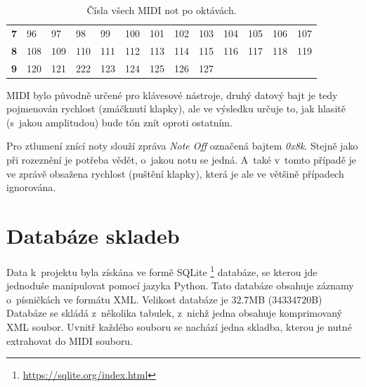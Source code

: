 \begin{table}[]
\begin{tabular}{l|llllllllllll}
        \textbf{7}                       & 96         & 97           & 98         & 99           & 100        & 101        & 102          & 103        & 104          & 105        & 106          & 107        \\
        \textbf{8}                       & 108        & 109          & 110        & 111          & 112        & 113        & 114          & 115        & 116          & 117        & 118          & 119        \\
        \textbf{9}                       & 120        & 121          & 222        & 123          & 124        & 125        & 126          & 127        & \multicolumn{4}{l}{}                                 
    \end{tabular}
    \caption{Čísla všech MIDI not po oktávách. \cite{Back_SMF_Specif}}
    \label{tableMIDINotes}
\end{table}

MIDI bylo původně určené pro klávesové nástroje, 
druhý datový bajt je tedy pojmenován rychlost (zmáčknutí klapky),
ale ve výsledku určuje to, jak hlasitě (s~jakou amplitudou) bude tón znít oproti ostatním.

Pro ztlumení znící noty slouží zpráva \emph{Note Off} označená bajtem \emph{0x8k}.
Stejně jako při rozeznění je potřeba vědět, o~jakou notu se jedná.
A~také v~tomto případě je ve zprávě obsažena rychlost (puštění klapky), 
která je ale ve většině případech ignorována.
\cite{MIDI_tutorials}

\section{Databáze skladeb}
\label{hooktheoryDB}
Data k~projektu byla získána ve formě SQLite
\footnote{\url{https://sqlite.org/index.html}} databáze,
se kterou jde jednoduše manipulovat pomocí jazyka Python.
Tato databáze obsahuje záznamy o~písničkách ve formátu XML.
Velikost databáze je $32.7$MB ($34 334 720$B)
Databáze se skládá z~několika tabulek,
z~nichž jedna obsahuje komprimovaný XML soubor.
Uvnitř každého souboru se nachází jedna skladba,
kterou je nutné extrahovat do MIDI souboru.
\par

